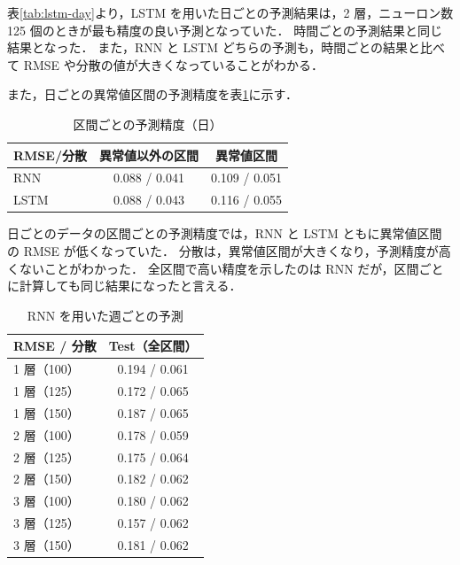 \documentclass[twocolumn,fleqn,10pt]{jarticle}
\begin{document}
表\ref{tab:lstm-day}より，LSTM を用いた日ごとの予測結果は，2 層，ニューロン数 125 個のときが最も精度の良い予測となっていた．
時間ごとの予測結果と同じ結果となった．
また，RNN と LSTM どちらの予測も，時間ごとの結果と比べて RMSE や分散の値が大きくなっていることがわかる．


また，日ごとの異常値区間の予測精度を表\ref{tab:ijou-day}に示す．



\begin{table}[t]
\centering
  \caption{区間ごとの予測精度（日）}
  \vspace{3mm}
  \begin{tabular}{|l||c|c|}  \hline
    RMSE/分散  & 異常値以外の区間 & 異常値区間 \\ \hline \hline
    RNN   &  0.088 / 0.041 & 0.109 / 0.051 \\ \hline
    LSTM  &  0.088 / 0.043 & 0.116 / 0.055 \\ \hline
  \end{tabular}
  \label{tab:ijou-day}
\end{table}



日ごとのデータの区間ごとの予測精度では，RNN と LSTM ともに異常値区間の RMSE が低くなっていた．
分散は，異常値区間が大きくなり，予測精度が高くないことがわかった．
全区間で高い精度を示したのは RNN だが，区間ごとに計算しても同じ結果になったと言える．







\begin{table}[t]
\centering
  \caption{RNN を用いた週ごとの予測}
  \vspace{3mm}
  \begin{tabular}{|l||c|}  \hline
    RMSE / 分散 & Test（全区間） \\ \hline \hline
    1 層（100） & 0.194 / 0.061 \\ \hline
    1 層（125） & 0.172 / 0.065 \\ \hline
    1 層（150） & 0.187 / 0.065 \\ \hline

    2 層（100） & 0.178 / 0.059 \\ \hline
    2 層（125） & 0.175 / 0.064 \\ \hline
    2 層（150） & 0.182 / 0.062 \\ \hline

    3 層（100） & 0.180 / 0.062 \\ \hline
    3 層（125） & 0.157 / 0.062 \\ \hline
    3 層（150） & 0.181 / 0.062 \\ \hline
  \end{tabular}
  \label{tab:rnn-week}
\end{table}
\end{document}

